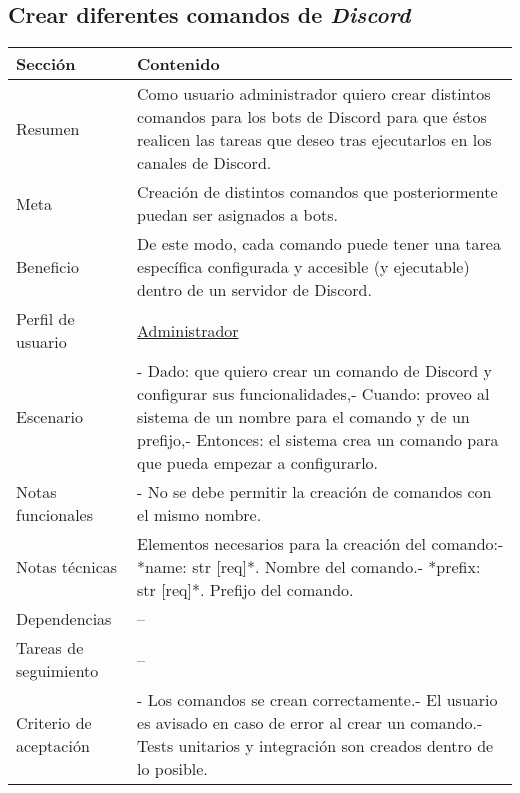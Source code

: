 \subsection{Crear diferentes comandos de \textit{Discord}}

\begin{table}[H]
    \centering
    \begin{adjustbox}{max width=\textwidth}
    \begin{tabularx}{\textwidth}{|l|L|}
    \hline
        Sección & Contenido \\ \hline
        Resumen & Como usuario administrador quiero crear distintos comandos para los bots de Discord para que éstos realicen las tareas que deseo tras ejecutarlos en los canales de Discord. \\ \hline
        Meta & Creación de distintos comandos que posteriormente puedan ser asignados a bots. \\ \hline
        Beneficio & De este modo, cada comando puede tener una tarea específica configurada y accesible (y ejecutable) dentro de un servidor de Discord. \\ \hline
        Perfil de usuario & \hyperref[sec:personaAdmin]{Administrador} \\ \hline
        Escenario & - Dado: que quiero crear un comando de Discord y configurar sus funcionalidades,\linebreak - Cuando: proveo al sistema de un nombre para el comando y de un prefijo,\linebreak - Entonces: el sistema crea un comando para que pueda empezar a configurarlo. \\ \hline
        Notas funcionales & - No se debe permitir la creación de comandos con el mismo nombre. \\ \hline
        Notas técnicas & Elementos necesarios para la creación del comando:\linebreak - *name: str [req]*. Nombre del comando.\linebreak - *prefix: str [req]*. Prefijo del comando. \\ \hline
        Dependencias & – \\ \hline
        Tareas de seguimiento & – \\ \hline
        Criterio de aceptación & - Los comandos se crean correctamente.\linebreak - El usuario es avisado en caso de error al crear un comando.\linebreak - Tests unitarios y integración son creados dentro de lo posible. \\ \hline
    \end{tabularx}
    \end{adjustbox}
\end{table}

